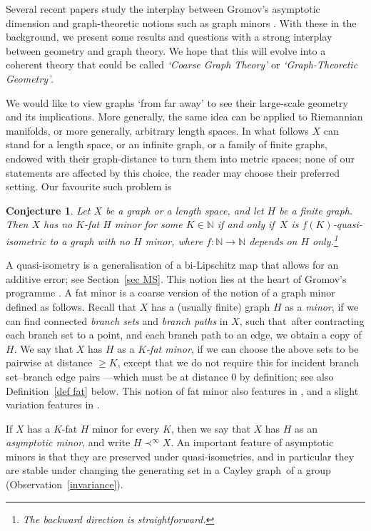 \documentclass[a4paper]{article}
\newcommand{\defi}[1]{{\color{darkgray}\emph{#1}}}
\newtheorem{conjecture}{{Conjecture}}[section]
\newcommand{\N}{\ensuremath{\mathbb N}}
\newcommand{\Cg}{Cayley graph}
\newcommand{\Sr}[1]{Section~\ref{#1}}
\newcommand{\Or}[1]{Observation~\ref{#1}}
\newcommand{\Dr}[1]{De\-fi\-nition~\ref{#1}}
\renewcommand{\iff}{if and only if}
\newcommand{\st}{such that}
\newcommand{\asmi}{asymptotic minor}
\newcommand{\asm}[2]{\ensuremath{#1 \prec^\infty #2}}
\begin{document}
Several recent papers study the interplay between Gromov's asymptotic dimension and graph-theoretic notions such as graph minors \cite{quasitrees,BBEGLPS,FujPapCoa,FujPapAsy,JorLanGeo,OstExp,OstRosMet}. With these in the background, we present some results and questions with a strong interplay between geometry and graph theory. We hope that this will evolve into a coherent theory that could be called \defi{`Coarse Graph Theory'} or \defi{`Graph-Theoretic Geometry'}.

We would like to view graphs `from far away' to see their large-scale geometry and its implications. More generally, the same idea can be applied to Riemannian manifolds, or more generally, arbitrary length spaces. In what follows $X$ can stand for a length space, or an infinite graph, or a family of finite graphs, endowed with their graph-distance to turn them into metric spaces; none of our statements are affected by this choice, the reader may choose their preferred setting. Our favourite such problem is


\begin{conjecture} \label{conj fat min}
Let $X$ be a graph or a length space, and let $H$ be a finite graph. Then $X$ has no $K$-fat $H$ minor for some $K\in \N$  \iff\ $X$ is $f(K)$-quasi-isometric to a graph with no $H$ minor, where $f: \N\to \N$ depends on $H$ only.\footnote{The backward direction is straightforward.}
\end{conjecture}

A quasi-isometry is a generalisation of a bi-Lipschitz map that allows for an additive error; see \Sr{sec MS}. This notion lies at the heart of Gromov's programme \cite{GroAsyInv}. A  fat minor is a coarse version of the notion of a graph minor  defined as follows.
Recall that $X$ has a (usually finite) graph $H$ as a \defi{minor}, if we can find connected \defi{branch sets} and \defi{branch paths} in $X$, \st\ after contracting each branch set to a point, and each branch path to an edge, we obtain a copy of $H$. We say that $X$ has $H$ as a \defi{$K$-fat minor}, if we can choose the above sets to be pairwise at distance $\geq K$, except that we do not require this for incident branch set--branch edge pairs ---which must be at distance 0 by definition; see also \Dr{def fat} below. This notion of fat minor also features in \cite{BBEGLPS}, and a slight variation features in \cite{CDNRV}. 


If $X$ has a $K$-fat $H$ minor for every $K$, then we say that $X$ has $H$ as an \defi{\asmi}, and write \defi{$\asm{H}{X}$}. An important feature of asymptotic minors is that they are preserved under quasi-isometries, and in particular they are stable under changing the generating set in a \Cg\ of a group (\Or{invariance}).
\end{document}
